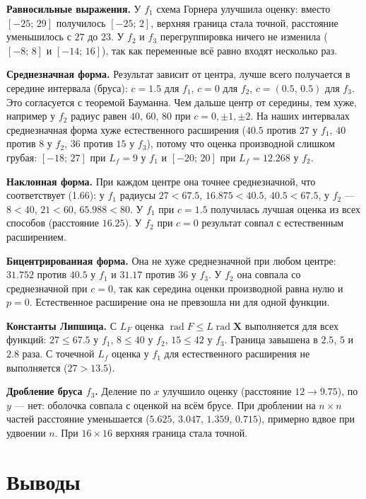 \documentclass[a4paper, 14pt]{extarticle}
\begin{document}
\textbf{Равносильные выражения.} У $f_1$ схема Горнера улучшила оценку: вместо $[-25;\,29]$ получилось $[-25;\,2]$, верхняя граница стала точной, расстояние уменьшилось с $27$ до $23$. У $f_2$ и $f_3$ перегруппировка ничего не изменила ($[-8;\,8]$ и $[-14;\,16]$), так как переменные всё равно входят несколько раз.

\textbf{Среднезначная форма.} Результат зависит от центра, лучше всего получается в середине интервала (бруса): $c = 1.5$ для $f_1$, $c = 0$ для $f_2$, $c = (0.5,\,0.5)$ для $f_3$. Это согласуется с теоремой Бауманна. Чем дальше центр от середины, тем хуже, например у $f_2$ радиус равен $40$, $60$, $80$ при $c = 0, \pm1, \pm2$. На наших интервалах среднезначная форма хуже естественного расширения ($40.5$ против $27$ у $f_1$, $40$ против $8$ у $f_2$, $36$ против $15$ у $f_3$), потому что оценка производной слишком грубая: $[-18;\,27]$ при $L_f = 9$ у $f_1$ и $[-20;\,20]$ при $L_f = 12.268$ у $f_2$.

\textbf{Наклонная форма.} При каждом центре она точнее среднезначной, что соответствует (1.66): у $f_1$ радиусы $27 < 67.5$, $16.875 < 40.5$, $40.5 < 67.5$, у $f_2$ --- $8 < 40$, $21 < 60$, $65.988 < 80$. У $f_1$ при $c = 1.5$ получилась лучшая оценка из всех способов (расстояние $16.25$). У $f_2$ при $c = 0$ результат совпал с естественным расширением.

\textbf{Бицентрированная форма.} Она не хуже среднезначной при любом центре: $31.752$ против $40.5$ у $f_1$ и $31.17$ против $36$ у $f_3$. У $f_2$ она совпала со среднезначной при $c = 0$, так как середина оценки производной равна нулю и $p = 0$. Естественное расширение она не превзошла ни для одной функции.

\textbf{Константы Липшица.} С $L_F$ оценка $\operatorname{rad}F \le L\operatorname{rad}\mathbf{X}$ выполняется для всех функций: $27 \le 67.5$ у $f_1$, $8 \le 40$ у $f_2$, $15 \le 42$ у $f_3$. Граница завышена в $2.5$, $5$ и $2.8$ раза. С точечной $L_f$ оценка у $f_1$ для естественного расширения не выполняется ($27 > 13.5$).

\textbf{Дробление бруса $f_3$.} Деление по $x$ улучшило оценку (расстояние $12 \to 9.75$), по $y$ --- нет: оболочка совпала с оценкой на всём брусе. При дроблении на $n \times n$ частей расстояние уменьшается ($5.625$, $3.047$, $1.359$, $0.715$), примерно вдвое при удвоении $n$. При $16\times16$ верхняя граница стала точной.

\section{Выводы}
\end{document}
